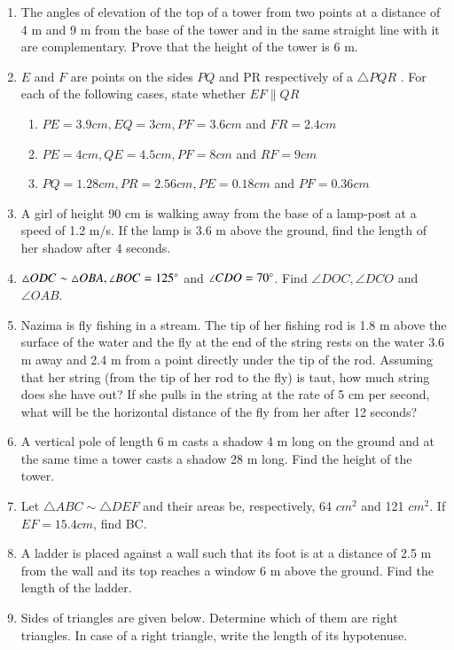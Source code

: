 \begin{enumerate}[label=\arabic*.,ref=\thesubsection.\theenumi]
\item The angles of elevation of the top of a tower from two points at a distance of 4 m and 9 m from the base of the tower and in the same straight line with it are complementary. Prove that the height of the tower is 6 m.
%
\item $E$ and $F$ are points on the sides  $PQ$  and PR respectively of a  $\triangle PQR$ . For each of the following cases, state whether $EF  \parallel  QR$ 
\begin{enumerate}
\item  $PE = 3.9 cm, EQ = 3 cm, PF = 3.6 cm$ and $FR = 2.4 cm $
\item  $PE = 4 cm, QE = 4.5 cm, PF = 8 cm$ and $RF = 9 cm $
\item   $PQ  = 1.28 cm, PR = 2.56 cm, PE = 0.18 cm$ and $PF = 0.36 cm$
\end{enumerate}
\item A girl of height 90 cm is walking away from the base of a lamp-post at a speed of 1.2 m/s. If the lamp is 3.6 m above the ground, find the length of her shadow after 4 seconds.
\item  $ \triangle  ODC \sim  \triangle  OBA, \angle BOC = 125 \degree$ and $\angle CDO = 70 \degree$. Find $\angle DOC, \angle DCO$ and $\angle OAB$.
\item  Nazima is fly fishing in a stream. The tip of her fishing rod is 1.8 m above the surface of the water and the fly at the end of the string rests on the water 3.6 m away and 2.4 m from a point directly under the tip of the rod. Assuming that her string (from the tip of her rod to the fly) is taut, how much string does she have out? If she pulls in the string at the rate of 5 cm per second, what will be the horizontal distance of the fly from her after 12 seconds?
%
\item  A vertical pole of length 6 m casts a shadow 4 m long on the ground and at the same time a tower casts a shadow 28 m long. Find the height of the tower.
\item Let  $\triangle  ABC  \sim   \triangle  DEF$ and their areas be, respectively, 64 $cm^2$ and 121 $cm^2$.  If $EF = 15.4 cm$, find BC.
\item A ladder is placed against a wall such that its foot is at a distance of 2.5 m from the wall and its top reaches a window 6 m above the ground. Find the length of the ladder.
\item Sides of triangles are given below. Determine which of them are right triangles. In case of a right triangle, write the length of its hypotenuse. 

\end{enumerate}
